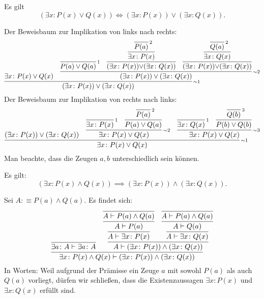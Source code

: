 \begin{Satz}\label{exists-dl}
Es gilt
\[(\exists x\colon P(x)\lor Q(x)) \iff
(\exists x\colon P(x))\lor(\exists x\colon Q(x)).\]
\end{Satz}
\begin{Beweis}[Beweis]
Der Beweisbaum zur Implikation von links nach rechts:
\[
\infer[\infernote{$\sim$1}]{(\exists x\colon P(x))\lor (\exists x\colon Q(x))}{
  \exists x\colon P(x)\lor Q(x)
& \infer[\infernote{$\sim$2}]{(\exists x\colon P(x))\lor (\exists x\colon Q(x))}{
    \infer[\infernote{1}]{P(a)\lor Q(a)}{}
  & \infer{(\exists x\colon P(x)){\lor}(\exists x\colon Q(x))}{\infer{
      \exists x\colon P(x)}{\infer[\infernote{2}]{P(a)}{}}}
  & \infer{(\exists x\colon P(x)){\lor}(\exists x\colon Q(x))}{\infer{
      \exists x\colon Q(x)}{\infer[\infernote{2}]{Q(a)}{}}}}}
\]
Der Beweisbaum zur Implikation von rechts nach links:
\[\infer[\infernote{$\sim$1}]{\exists x\colon P(x)\lor Q(x)}{
  (\exists x\colon P(x))\lor(\exists x\colon Q(x))
  & \infer[\infernote{$\sim$2}]{\exists x\colon P(x)\lor Q(x)}{
      \infer[\infernote{1}]{\exists x\colon P(x)}{}
      &
      \infer{P(a)\lor Q(a)}{
        \infer[\infernote{2}]{P(a)}{}}}
  & \infer[\infernote{$\sim$3}]{\exists x\colon P(x)\lor Q(x)}{
      \infer[\infernote{1}]{\exists x\colon Q(x)}{}
      &
      \infer{P(b)\lor Q(b)}{
        \infer[\infernote{3}]{Q(b)}{}}}
}\]
Man beachte, dass die Zeugen $a,b$ unterschiedlich sein können.\,\qedsymbol
\end{Beweis}

\begin{Satz}\label{exists-asym-dl}
Es gilt:
\[(\exists x\colon P(x)\land Q(x)) \implies (\exists x\colon P(x))\land (\exists x\colon Q(x)).\]
\end{Satz}
\begin{Beweis}[Beweis] Sei $A:\equiv P(a)\land Q(a)$. Es findet sich:
\[
\infer{\exists x\colon P(x)\land Q(x)\vdash (\exists x\colon P(x))\land (\exists x\colon Q(x))}{
  \infer{\exists a\colon A\vdash\exists a\colon A}{}
& \infer{A\vdash (\exists x\colon P(x))\land (\exists x\colon Q(x))}{
    \infer{A\vdash\exists x\colon P(x)}{
      \infer{A\vdash P(a)}{\infer{A\vdash P(a)\land Q(a)}{}}}
  & \infer{A\vdash\exists x\colon Q(x)}{
       \infer{A\vdash Q(a)}{\infer{A\vdash P(a)\land Q(a)}{}}}}}
\]
In Worten: Weil aufgrund der Prämisse ein Zeuge $a$ mit sowohl $P(a)$
als auch $Q(a)$ vorliegt, dürfen wir schließen, dass die
Existenzaussagen $\exists x\colon P(x)$ und $\exists x\colon Q(x)$
erfüllt sind.\,\qedsymbol
\end{Beweis}

